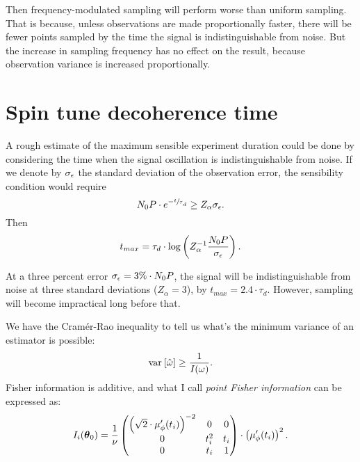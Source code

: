 \documentclass{article}
\newcommand{\obs}{\epsilon}
\begin{document}
Then frequency-modulated sampling will perform worse than uniform sampling. That is because, unless observations are made proportionally faster, there will be fewer points sampled by the time the signal is indistinguishable from noise. But the increase in sampling frequency has no effect on the result, because observation variance is increased proportionally.

\section{Spin tune decoherence time}

A rough estimate of the maximum sensible experiment duration could be done by considering the time when the signal oscillation is indistinguishable from noise. If we denote by $\SD{\obs}$ the standard deviation of the observation error, the sensibility condition would require
\[
	N_0P\cdot e^{-\sfrac t\tau_d} \geq Z_\alpha \SD{\obs}.
\]
Then 
\[
	t_{max} = \tau_d\cdot \log\bkt{Z_\alpha^{-1}\frac{N_0P}{\SD{\obs}}}.
\]

At a three percent error $\SD{\obs} = 3\%\cdot N_0P$, the signal will be indistinguishable from noise at three standard deviations ($Z_\alpha = 3$), by $t_{max} = 2.4\cdot \tau_d$. However, sampling will become impractical long before that.

We have the Cram\'er-Rao inequality to tell us what's the minimum variance of an estimator is possible:
\[
	\var{\hat{\omega}} \geq \frac{1}{\Fisher(\omega)}.
\]
Fisher information is additive, and what I call \emph{point Fisher information} can be expressed as:
\[
	\Fisher[i] = \frac{1}{\nu}\begin{pmatrix}
		\bkt{\sqrt{2}\cdot\mupp}^{-2} & 0     & 0   \\
		0                             & t_i^2 & t_i \\
		0                             & t_i   & 1
	\end{pmatrix}\cdot \bkt{\mupp}^2.
\]

\begin{wrapfigure}{l}{.25\textwidth}
\end{wrapfigure}
\end{document}
